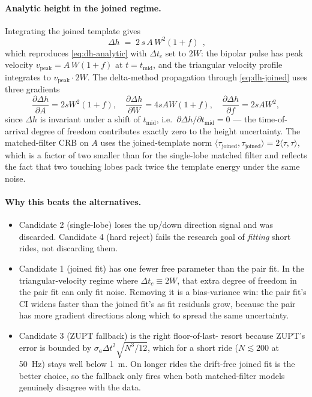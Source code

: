 \paragraph{Analytic height in the joined regime.} Integrating the
joined template gives
\begin{equation}
  \boxed{\;\Delta h \;=\; 2\,s\,A\,W^{2}(1+f)\;}\,,
  \label{eq:dh-joined}
\end{equation}
which reproduces \eqref{eq:dh-analytic} with $\Delta t_c$ set to
$2W$: the bipolar pulse has peak velocity $v_\mathrm{peak}=
A\,W(1+f)$ at $t=t_\mathrm{mid}$, and the triangular velocity
profile integrates to $v_\mathrm{peak}\cdot 2W$. The delta-method
propagation through \eqref{eq:dh-joined} uses three gradients
\begin{equation}
  \frac{\partial\Delta h}{\partial A} = 2sW^{2}(1+f),\quad
  \frac{\partial\Delta h}{\partial W} = 4sAW(1+f),\quad
  \frac{\partial\Delta h}{\partial f} = 2sAW^{2},
  \label{eq:dh-joined-gradients}
\end{equation}
since $\Delta h$ is invariant under a shift of $t_\mathrm{mid}$,
i.e.\ $\partial\Delta h/\partial t_\mathrm{mid}=0$ — the time-of-
arrival degree of freedom contributes exactly zero to the height
uncertainty. The matched-filter CRB on $A$ uses the joined-template
norm
\(\langle\tau_\mathrm{joined},\tau_\mathrm{joined}\rangle =
2\langle\tau,\tau\rangle\), which is a factor of two smaller than
for the single-lobe matched filter and reflects the fact that two
touching lobes pack twice the template energy under the same noise.

\paragraph{Why this beats the alternatives.}
\begin{itemize}
  \item Candidate 2 (single-lobe) loses the up/down direction
        signal and was discarded. Candidate 4 (hard reject) fails
        the research goal of \emph{fitting} short rides, not
        discarding them.
  \item Candidate 1 (joined fit) has one fewer free parameter than
        the pair fit. In the triangular-velocity regime where
        $\Delta t_c \equiv 2W$, that extra degree of freedom in the
        pair fit can only fit noise. Removing it is a bias-variance
        win: the pair fit's CI widens faster than the joined fit's
        as fit residuals grow, because the pair has more gradient
        directions along which to spread the same uncertainty.
  \item Candidate 3 (ZUPT fallback) is the right floor-of-last-
        resort because ZUPT's error is bounded by
        $\sigma_a \Delta t^{2}\sqrt{N^{3}/12}$, which for a short
        ride ($N\lesssim 200$ at 50~Hz) stays well below 1~m. On
        longer rides the drift-free joined fit is the better
        choice, so the fallback only fires when both matched-filter
        models genuinely disagree with the data.
\end{itemize}

